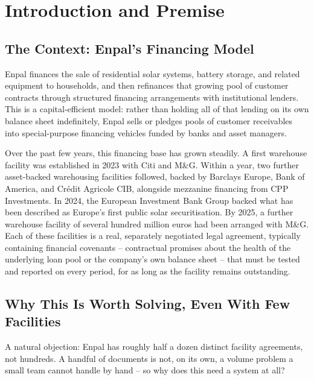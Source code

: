 \documentclass[11pt,a4paper]{article}
\begin{document}
\section{Introduction and Premise}

\subsection{The Context: Enpal's Financing Model}

Enpal finances the sale of residential solar systems, battery storage, and related equipment to households, and then refinances that growing pool of customer contracts through structured financing arrangements with institutional lenders. This is a capital-efficient model: rather than holding all of that lending on its own balance sheet indefinitely, Enpal sells or pledges pools of customer receivables into special-purpose financing vehicles funded by banks and asset managers.

Over the past few years, this financing base has grown steadily. A first warehouse facility was established in 2023 with Citi and M\&G. Within a year, two further asset-backed warehousing facilities followed, backed by Barclays Europe, Bank of America, and Cr\'edit Agricole CIB, alongside mezzanine financing from CPP Investments. In 2024, the European Investment Bank Group backed what has been described as Europe's first public solar securitisation. By 2025, a further warehouse facility of several hundred million euros had been arranged with M\&G. Each of these facilities is a real, separately negotiated legal agreement, typically containing financial covenants -- contractual promises about the health of the underlying loan pool or the company's own balance sheet -- that must be tested and reported on every period, for as long as the facility remains outstanding.

\subsection{Why This Is Worth Solving, Even With Few Facilities}

A natural objection: Enpal has roughly half a dozen distinct facility agreements, not hundreds. A handful of documents is not, on its own, a volume problem a small team cannot handle by hand -- so why does this need a system at all?
\end{document}
